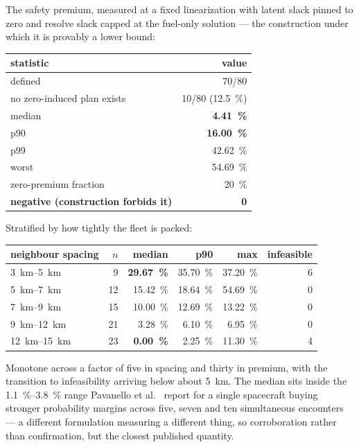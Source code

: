 The safety premium, measured at a fixed linearization with latent slack pinned
to zero and resolve slack capped at the fuel-only solution --- the construction
under which it is provably a lower bound:

\begin{center}
\begin{tabular}{lr}
\toprule
statistic & value \\
\midrule
defined & 70/80 \\
no zero-induced plan exists & 10/80 (\SI{12.5}{\percent}) \\
median & \textbf{\SI{4.41}{\percent}} \\
p90 & \textbf{\SI{16.00}{\percent}} \\
p99 & \SI{42.62}{\percent} \\
worst & \SI{54.69}{\percent} \\
zero-premium fraction & \SI{20}{\percent} \\
\textbf{negative (construction forbids it)} & \textbf{0} \\
\bottomrule
\end{tabular}
\end{center}

Stratified by how tightly the fleet is packed:

\begin{center}
\begin{tabular}{lrrrrr}
\toprule
neighbour spacing & $n$ & median & p90 & max & infeasible \\
\midrule
\SIrange{3}{5}{\kilo\meter}   &  9 & \textbf{\SI{29.67}{\percent}} & \SI{35.70}{\percent} & \SI{37.20}{\percent} & 6 \\
\SIrange{5}{7}{\kilo\meter}   & 12 & \SI{15.42}{\percent} & \SI{18.64}{\percent} & \SI{54.69}{\percent} & 0 \\
\SIrange{7}{9}{\kilo\meter}   & 15 & \SI{10.00}{\percent} & \SI{12.69}{\percent} & \SI{13.22}{\percent} & 0 \\
\SIrange{9}{12}{\kilo\meter}  & 21 & \SI{3.28}{\percent}  & \SI{6.10}{\percent}  & \SI{6.95}{\percent}  & 0 \\
\SIrange{12}{15}{\kilo\meter} & 23 & \textbf{\SI{0.00}{\percent}} & \SI{2.25}{\percent} & \SI{11.30}{\percent} & 4 \\
\bottomrule
\end{tabular}
\end{center}

Monotone across a factor of five in spacing and thirty in premium, with the
transition to infeasibility arriving below about \SI{5}{\kilo\meter}. The
median sits inside the \SIrange{1.1}{3.8}{\percent} range Pavanello et
al.~\cite{pavanello2024} report for a single spacecraft buying stronger
probability margins across five, seven and ten simultaneous encounters --- a
different formulation measuring a different thing, so corroboration rather than
confirmation, but the closest published quantity.

